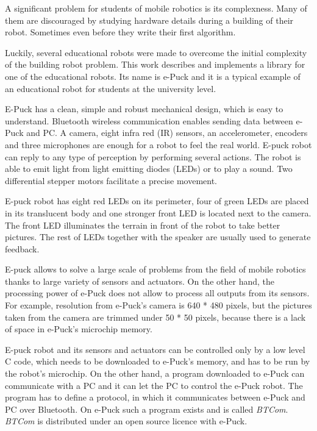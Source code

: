 \documentclass[12pt,notitlepage]{report}
\begin{document}
	A significant problem for students of mobile robotics is its complexness. Many of them are discouraged by
	studying hardware  details during a building of their robot. 
	Sometimes even before they write  their first algorithm.

	Luckily, several educational robots were made to overcome the initial complexity of the building robot problem.	
	This work describes and implements a library for one of the educational robots.
	Its name is e-Puck and it is a typical example of an educational robot for students at the university level. 
	
	E-Puck has a clean, simple and robust mechanical design, which is easy to understand.
	Bluetooth wireless communication enables sending data between e-Puck and PC.
	A camera, eight infra red (IR) sensors,	an accelerometer, encoders and three microphones 
	are enough for a robot to feel the real world.
	E-puck robot can reply to any type of perception by performing several actions. 
	The robot is able to emit light from light emitting diodes (LEDs) or to play a sound.
	Two differential stepper motors facilitate a precise movement. 
	
	E-puck robot has eight red LEDs on its perimeter, four of green LEDs are placed in its translucent body and
	one stronger front LED is located next to the camera. 
	The front LED illuminates the terrain in front of the robot to
	take better pictures. The rest of LEDs together with the speaker are usually used to
	generate feedback. 
	
	E-puck allows to solve a large scale of problems from the field of mobile robotics thanks to 
	large variety of sensors and actuators. On the other hand, the processing power of e-Puck does not allow to 
	process all outputs from its sensors. For example, resolution from e-Puck's camera is 640 * 480 pixels,
	but the pictures taken from the camera are trimmed under 50 * 50 pixels, because there is a lack of space in 
	 e-Puck's microchip memory.
	 
	 E-puck robot and its sensors and actuators can be controlled only by a low level C code,
	  which needs to be downloaded to e-Puck's memory, and has to be run by the robot's microchip.
	 On the other hand, a program downloaded to e-Puck can communicate with
	 a PC and it can let the PC to control the e-Puck robot. 
	 The program has to define a protocol, in which it communicates between e-Puck and PC over Bluetooth.
	On e-Puck such a program exists and is called {\it BTCom}. 
	{\it BTCom} is distributed under an open source licence with e-Puck.
\end{document}
